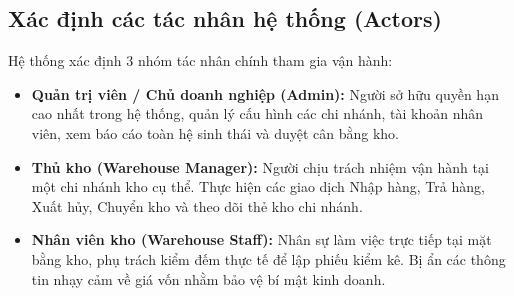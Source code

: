 \documentclass[12pt,a4paper]{report}
\renewcommand{\_}{\textunderscore\allowbreak}
\begin{document}
\subsection{Xác định các tác nhân hệ thống (Actors)}
Hệ thống xác định 3 nhóm tác nhân chính tham gia vận hành:
\begin{itemize}
    \item \textbf{Quản trị viên / Chủ doanh nghiệp (Admin):} Người sở hữu quyền hạn cao nhất trong hệ thống, quản lý cấu hình các chi nhánh, tài khoản nhân viên, xem báo cáo toàn hệ sinh thái và duyệt cân bằng kho.
    \item \textbf{Thủ kho (Warehouse Manager):} Người chịu trách nhiệm vận hành tại một chi nhánh kho cụ thể. Thực hiện các giao dịch Nhập hàng, Trả hàng, Xuất hủy, Chuyển kho và theo dõi thẻ kho chi nhánh.
    \item \textbf{Nhân viên kho (Warehouse Staff):} Nhân sự làm việc trực tiếp tại mặt bằng kho, phụ trách kiểm đếm thực tế để lập phiếu kiểm kê. Bị ẩn các thông tin nhạy cảm về giá vốn nhằm bảo vệ bí mật kinh doanh.
\end{itemize}
\end{document}

